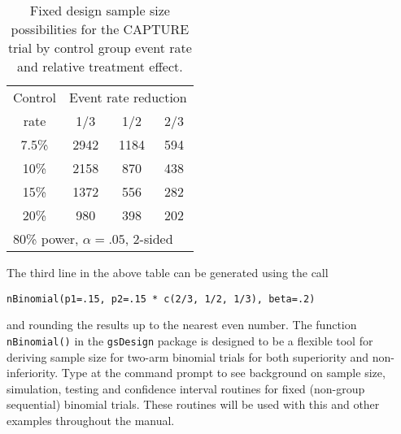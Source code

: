\bigskip 
\begin{table}
\begin{center}
\caption{Fixed design sample size possibilities for the CAPTURE trial by control group event rate and relative treatment effect.\label{tab:capture}}
\begin{tabular}
[c]{cccc}\hline
Control   &\multicolumn{3}{c}{Event rate reduction}\\
rate    &1/3    & 1/2     &2/3 \\ \hline
7.5\%   &2942   &1184     &594 \\
10\%    &2158   &870      &438 \\
15\%    &1372   &556      &282 \\
20\%    &980    &398      &202 \\ \hline
\multicolumn{4}{l}{80\% power, $\alpha=.05$, 2-sided}
\end{tabular}
\end{center}
\end{table}
\bigskip
The third line in the above table can be generated using the call \begin{verbatim}
nBinomial(p1=.15, p2=.15 * c(2/3, 1/2, 1/3), beta=.2)
\end{verbatim}
and rounding the results up to the nearest even number. The function \texttt{nBinomial()} in the \texttt{gsDesign} package is designed to be a flexible tool for deriving sample size for two-arm binomial trials for both superiority and non-inferiority. Type  at the command prompt to see background on sample size, simulation, testing and confidence interval routines for fixed (non-group sequential) binomial trials. These routines will be used with this and other examples throughout the manual.
